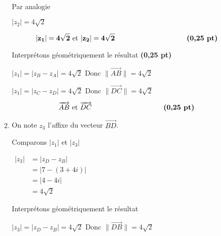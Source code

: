 \documentclass[12pt,a4paper]{article}
\begin{document}
\begin{enumerate}
\begin{enumerate}
Par analogie        
        
        \( |z_2| = 4\sqrt{2} \)

\begin{resultbox}
    \[
    \mathbf{ |z_1| = 4\sqrt{2} \text{ et } |z_2|  = 4\sqrt{2} \hspace{3.6cm} \textbf{(0,25 pt)}}
    \]
\end{resultbox}        
        
        Interprétons géométriquement le résultat \hfill \textbf{(0,25 pt)}

\( |z_1| =  |z_B-z_A| = 4\sqrt{2} \text{ Donc   } \|\overrightarrow{AB}\| = 4\sqrt{2} \) 

\( |z_1| = 	|z_C-z_D| = 4\sqrt{2} \text{ Donc } \|\overrightarrow{DC}\| = 4\sqrt{2} \)   


\begin{resultbox}
    \[
    \mathbf{ \overrightarrow{AB} \text{ et }  \overrightarrow{DC} \hspace{3.6cm} \textbf{(0,25 pt)}}
    \]
\end{resultbox}   
   
        
        \item On note \( z_3 \) l’affixe du vecteur \( \overrightarrow{BD} \). 
        
        Comparons \( |z_1| \) et \( |z_3| \) 

				\(
				\begin{aligned}
				 |z_3| &= |z_D - z_B| \\
				 			 &= |7 -(3+4i)|\\
				 			 &= |4-4i|\\
				 			 &=4\sqrt{2}
				\end{aligned} 
				\)        

Interprétons géométriquement le résultat 

\( |z_3| = |z_D - z_B| = 4\sqrt{2} \text{ Donc } \|\overrightarrow{DB}\| = 4\sqrt{2} \) 


\end{enumerate}
\end{enumerate}
\end{document}
